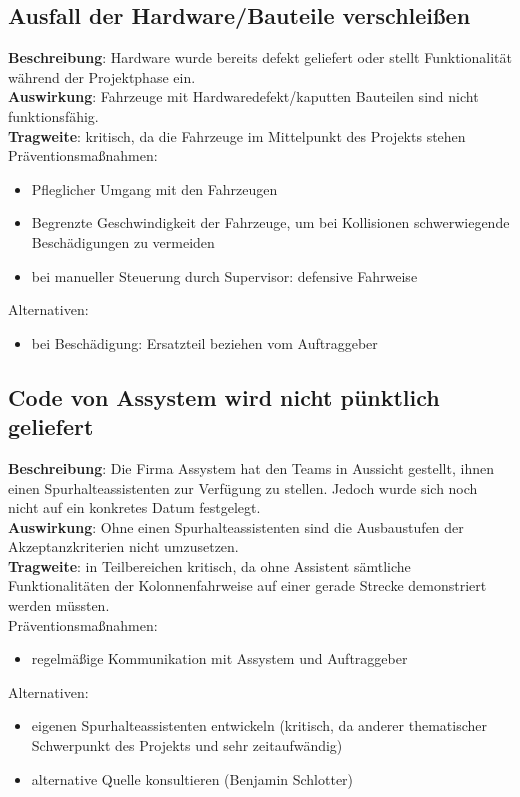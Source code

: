 \documentclass[a4paper, 12pt, titlepage]{scrartcl}
\begin{document}
	\subsection{Ausfall der Hardware/Bauteile verschlei\ss en}
		\textbf{Beschreibung}: Hardware wurde bereits defekt geliefert oder stellt Funktionalit\"at w\"ahrend der Projektphase ein.\\
		\textbf{Auswirkung}: Fahrzeuge mit Hardwaredefekt/kaputten Bauteilen sind nicht funktionsf\"ahig.\\
		\textbf{Tragweite}: kritisch, da die Fahrzeuge im Mittelpunkt des Projekts stehen\\
		Pr\"aventionsma\ss nahmen:
			\begin{itemize}
				\item Pfleglicher Umgang mit den Fahrzeugen
				\item Begrenzte Geschwindigkeit der Fahrzeuge, um bei Kollisionen schwerwiegende Besch\"adigungen zu vermeiden
				\item bei manueller Steuerung durch Supervisor: defensive Fahrweise
			\end{itemize}
		Alternativen: 
			\begin{itemize}
				\item bei Besch\"adigung: Ersatzteil beziehen vom Auftraggeber
			\end{itemize}
		
	\subsection{Code von Assystem wird nicht p\"unktlich geliefert}
		\textbf{Beschreibung}: Die Firma Assystem hat den Teams in Aussicht gestellt, ihnen einen Spurhalteassistenten zur Verf\"ugung zu stellen. Jedoch wurde sich noch nicht auf ein konkretes Datum festgelegt. \\
		\textbf{Auswirkung}: Ohne einen Spurhalteassistenten sind die Ausbaustufen der Akzeptanzkriterien nicht umzusetzen.\\
		\textbf{Tragweite}: in Teilbereichen kritisch, da ohne Assistent s\"amtliche Funktionalit\"aten der Kolonnenfahrweise auf einer gerade Strecke demonstriert werden m\"ussten.\\
		Pr\"aventionsma\ss nahmen:
			\begin{itemize}
				\item regelm\"a\ss ige Kommunikation mit Assystem und Auftraggeber
			\end{itemize}
		Alternativen: 
			\begin{itemize}
				\item eigenen Spurhalteassistenten entwickeln (kritisch, da anderer thematischer Schwerpunkt des Projekts und sehr zeitaufw\"andig)
				\item alternative Quelle konsultieren (Benjamin Schlotter)
			\end{itemize}
		
\end{document}
